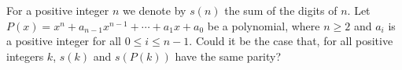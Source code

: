 For a positive integer $n$ we denote by $s(n)$ the sum of the digits of $n$. Let $P(x) = x^n + a_{n-1}x^{n-1} + \cdots + a_1 x + a_0$ be a polynomial, where $n \geq 2$ and $a_i$ is a positive integer for all $0 \leq i \leq n-1$. Could it be the case that, for all positive integers $k$, $s(k)$ and $s(P(k))$ have the same parity?
